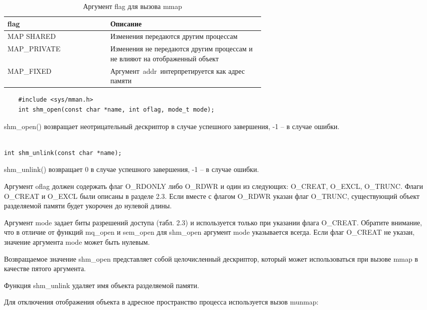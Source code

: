 \documentclass[a4paper,14pt]{extarticle}
\begin{document}
 
 \begin{table}[h!]
 	\centering
 	\caption{Аргумент flag для вызова mmap}
 	\begin{tabular}{|l|p{0.6\linewidth}|}
 		\hline
 		\textbf{flag} & \textbf{Описание} \\ \hline
 		MAP SHARED & Изменения передаются другим процессам \\ \hline
 		MAP\_PRIVATE & Изменения не передаются другим процессам и не влияют на отображенный объект \\ \hline
 		MAP\_FIXED & Аргумент addr интерпретируется как адрес памяти \\ \hline
 	\end{tabular}
 	\label{tab:flag}
 \end{table}


\begin{lstlisting}
	#include <sys/mman.h>
	int shm_open(const char *name, int oflag, mode_t mode);
\end{lstlisting}
	shm\_open() возвращает неотрицательный дескриптор в случае успешного завершения, -1 – в случае ошибки.


\begin{lstlisting}

int shm_unlink(const char *name);

\end{lstlisting}
shm\_unlink() возвращает 0 в случае успешного завершения, -1 – в случае ошибки.

Аргумент oflag должен содержать флаг O\_RDONLY либо O\_RDWR и один из следующих: O\_CREAT, O\_EXCL, O\_TRUNC. Флаги O\_CREAT и O\_EXCL были описаны в разделе 2.3. Если вместе с флагом O\_RDWR указан флаг O\_TRUNC, существующий объект разделяемой памяти будет укорочен до нулевой длины.

Аргумент mode задает биты разрешений доступа (табл. 2.3) и используется только при указании флага O\_CREAT. Обратите внимание, что в отличие от функций mq\_open и sem\_open для shm\_open аргумент mode указывается всегда. Если флаг O\_CREAT не указан, значение аргумента mode может быть нулевым.

Возвращаемое значение shm\_open представляет собой целочисленный дескриптор, который может использоваться при вызове mmap в качестве пятого аргумента.

Функция shm\_unlink удаляет имя объекта разделяемой памяти.
 


Для отключения отображения объекта в адресное пространство процесса используется вызов munmap:
\end{document}
